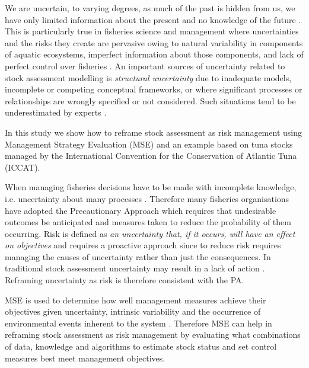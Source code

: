 \documentclass[%
nonumbib,      %
%
]{nrc1}                          %
\begin{document}
We are uncertain, to varying degrees, as much of the past is hidden from us, we have only limited information about the present and no knowledge of the future \cite{lindley2006understanding}. This is particularly true in fisheries science and management where uncertainties and the risks they create are pervasive owing to natural variability in components of aquatic ecosystems, imperfect information about those components, and lack of perfect control over fisheries \cite{peterman2004possible}. An important sources of uncertainty related to stock assessment modelling is \textit{structural uncertainty} due to inadequate models, incomplete or competing conceptual frameworks, or where significant processes or relationships are wrongly specified or not considered. Such situations tend to be underestimated by experts \cite{morgan1990uncertainty}. 


In this study we show how to reframe stock assessment as risk management using  Management Strategy Evaluation (MSE) and an example based on tuna stocks managed by the International Convention for the Conservation of Atlantic Tuna (ICCAT).

When managing fisheries decisions have to be made with incomplete knowledge, i.e. uncertainty about many processes . Therefore many fisheries organisations have adopted the Precautionary Approach \citep[PA,][]{garcia1996precautionary} which requires that undesirable outcomes be anticipated and measures taken to reduce the probability of them occurring. Risk is defined as \textit{an uncertainty that, if it occurs, will have an effect on objectives} \citep{hillson2011risk} and requires a proactive approach since to reduce risk requires managing the causes of uncertainty rather than just the consequences. In traditional stock assessment uncertainty may result in a lack of action \citep[e.g.][]{fromentin2014spectre}. Reframing uncertainty as risk is therefore consistent with the PA.

MSE is used to determine how well management measures achieve their objectives given uncertainty, intrinsic variability and the occurrence of environmental events inherent to the system \citep{kirkwood1995assessing}. Therefore MSE can help in reframing stock assessment as risk management by evaluating what combinations of data, knowledge and algorithms to estimate stock status and set control measures best meet management objectives. 
\end{document}
